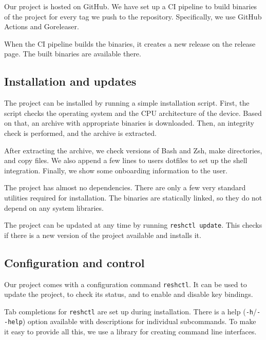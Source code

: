 Our project is hosted on GitHub\cite{resh-github-homepage}. We have set up a CI pipeline to build binaries of the project for every tag we push to the repository. Specifically, we use GitHub Actions\cite{github-actions} and Goreleaser\cite{tools-goreleaser}.

When the CI pipeline builds the binaries, it creates a new release on the release page\cite{resh-github-releases}. The built binaries are available there. 

\subsection{Installation and updates}

The project can be installed by running a simple installation script.
First, the script checks the operating system and the CPU architecture of the device. Based on that, an archive with appropriate binaries is downloaded. Then, an integrity check is performed, and the archive is extracted. 

After extracting the archive, we check versions of Bash and Zsh, make directories, and copy files. We also append a few lines to users dotfiles to set up the shell integration. Finally, we show some onboarding information to the user.

The project has almost no dependencies. There are only a few very standard utilities required for installation. The binaries are statically linked, so they do not depend on any system libraries.

The project can be updated at any time by running \verb|reshctl update|. This checks if there is a new version of the project available and installs it.

\subsection{Configuration and control}

Our project comes with a configuration command \verb|reshctl|. It can be used to update the project, to check its status, and to enable and disable key bindings. 

Tab completions for \verb|reshctl| are set up during installation. There is a help (\verb|-h|/\verb|--help|) option available with descriptions for individual subcommands. To make it easy to provide all this, we use a library\cite{lib-go-cobra} for creating command line interfaces.
